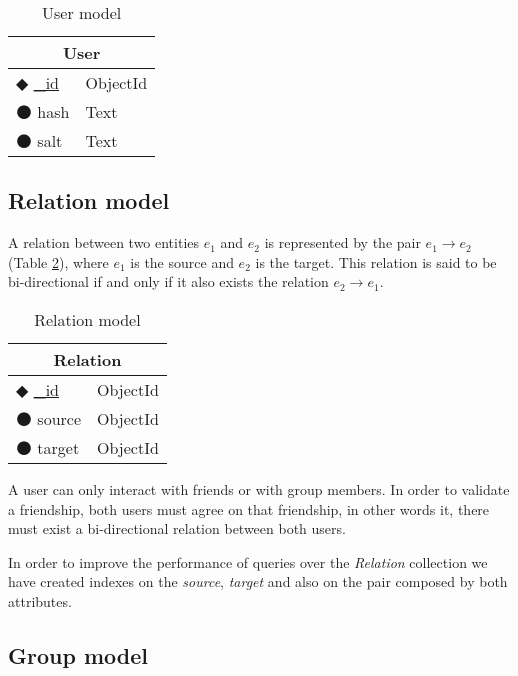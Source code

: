 \begin{table}[!htb]
\centering
\caption{User model}
\label{table:user}
    \begin{tabular}{|ll|}
        \hline
        \multicolumn{2}{|c|}{\textbf{User}}         \\ \hline
        $\Diamondblack$ \underline{\_id}  & ObjectId  \\ 
        $\medbullet$ hash           & Text          \\ 
        $\medbullet$ salt      & Text               \\ \hline
    \end{tabular}
\end{table}

\subsection{Relation model}

A relation between two entities $e_1$ and $e_2$ is represented by the pair $e_1\rightarrow e_2$ (Table \ref{table:relation}), where $e_1$ is the source and $e_2$ is the target. This relation is said to be bi-directional if and only if it also exists the relation $e_2\rightarrow e_1$.

\begin{table}[!htb]
\centering
\caption{Relation model}
\label{table:relation}
    \begin{tabular}{|ll|}
        \hline
        \multicolumn{2}{|c|}{\textbf{Relation}}     \\ \hline
        $\Diamondblack$ \underline{\_id}  & ObjectId  \\ 
        $\medbullet$ source           & ObjectId    \\ 
        $\medbullet$ target      & ObjectId         \\ \hline
    \end{tabular}
\end{table}

A user can only interact with friends or with group members. In order to validate a friendship, both users must agree on that friendship, in other words it, there must exist a bi-directional relation between both users.

In order to improve the performance of queries over the \emph{Relation} collection we have created indexes on the \emph{source}, \emph{target} and also on the pair composed by both attributes.

\subsection{Group model}

